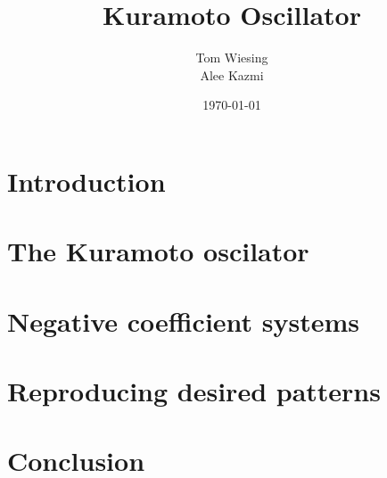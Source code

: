 \documentclass[12pt]{article}
\title{Kuramoto Oscillator}
\author{Tom Wiesing \\ Alee Kazmi}
\date{\today}
\begin{document}
	
	\maketitle
	\newpage
	
	\tableofcontents
	\newpage
	
	\section{Introduction}
	
	\newpage
	
	\section{The Kuramoto oscilator}
	
	\newpage
	
	\section{Negative coefficient systems}
	
	\newpage
	
	\section{Reproducing desired patterns}
	
	\newpage
	
	\section{Conclusion}
	
	
\end{document}
